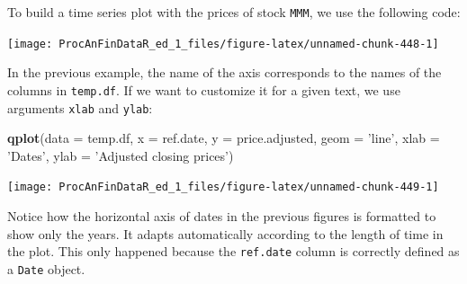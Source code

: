 \documentclass[11pt,]{book}
\newenvironment{Shaded}{\begin{snugshade}}{\end{snugshade}}
\newcommand{\KeywordTok}[1]{\textcolor[rgb]{0.27,0.27,0.27}{\textbf{#1}}}
\newcommand{\DataTypeTok}[1]{\textcolor[rgb]{0.27,0.27,0.27}{#1}}
\newcommand{\StringTok}[1]{\textcolor[rgb]{0.5,0.5,0.5}{#1}}
\newcommand{\CommentTok}[1]{\textcolor[rgb]{0.56,0.35,0.01}{\textit{#1}}}
\newcommand{\OperatorTok}[1]{\textcolor[rgb]{0.81,0.36,0.00}{\textbf{#1}}}
\newcommand{\NormalTok}[1]{#1}
\begin{document}
To build a time series plot with the prices of stock \texttt{MMM}, we
use the following code:

\begin{Shaded}
\end{Shaded}

\begin{center}\texttt{[image: ProcAnFinDataR\_ed\_1\_files/figure-latex/unnamed-chunk-448-1]} \end{center}

In the previous example, the name of the axis corresponds to the names
of the columns in \texttt{temp.df}. If we want to customize it for a
given text, we use arguments \texttt{xlab} and \texttt{ylab}:

\begin{Shaded}
\begin{Highlighting}[]
\KeywordTok{qplot}\NormalTok{(}\DataTypeTok{data =}\NormalTok{ temp.df, }
      \DataTypeTok{x =}\NormalTok{ ref.date, }
      \DataTypeTok{y =}\NormalTok{ price.adjusted, }
      \DataTypeTok{geom =} \StringTok{'line'}\NormalTok{, }
      \DataTypeTok{xlab =} \StringTok{'Dates'}\NormalTok{, }
      \DataTypeTok{ylab =} \StringTok{'Adjusted closing prices'}\NormalTok{)}
\end{Highlighting}
\end{Shaded}

\begin{center}\texttt{[image: ProcAnFinDataR\_ed\_1\_files/figure-latex/unnamed-chunk-449-1]} \end{center}

Notice how the horizontal axis of dates in the previous figures is
formatted to show only the years. It adapts automatically according to
the length of time in the plot. This only happened because the
\texttt{ref.date} column is correctly defined as a \texttt{Date} object.
\end{document}
